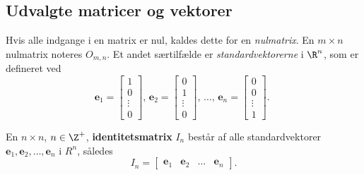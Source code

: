 \subsection{Udvalgte matricer og vektorer} 
% 
Hvis alle indgange i en matrix er nul, kaldes dette for en \textit{nulmatrix}. 
En $m \times n$ nulmatrix noteres $O_{m,n}$.
%
Et andet særtilfælde er \textit{standardvektorerne} i $\R^n$, som er defineret ved  
%
$$
\textbf{e}_1=
\begin{bmatrix}
1 \\ 
0 \\ 
\vdots \\
0
\end{bmatrix}
\text{, }
\textbf{e}_2=
\begin{bmatrix}
0 \\ 
1 \\ 
\vdots \\
0
\end{bmatrix}
\text{, }
\ldots
\text{, }
\textbf{e}_n=
\begin{bmatrix}
0 \\ 
0 \\ 
\vdots \\
1
\end{bmatrix}
\text{. }
$$
%
\begin{defn}{}{}
%
En $n \times n$, $n \in \Z^+$, \textbf{identitetsmatrix} $I_n$ består af alle standardvektorer $\textbf{e}_1, \textbf{e}_2, \ldots, \textbf{e}_n$ i $R^n$, således 
$$
I_n=
\begin{bmatrix}
\textbf{e}_1 & \textbf{e}_2 & \ldots & \textbf{e}_n
\end{bmatrix}.
$$ 
\end{defn}
\noindent
%
